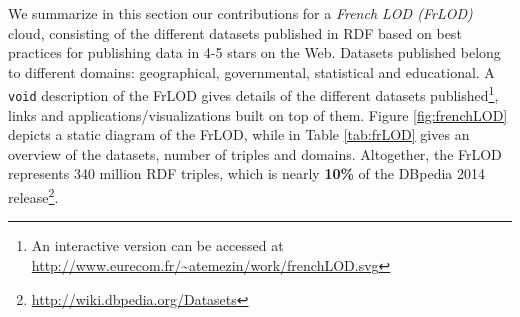We summarize in this section our contributions for a \textit{French LOD (FrLOD)} cloud, consisting of the different datasets published in RDF based on best practices for publishing data in 4-5 stars on the Web. Datasets published belong to different domains: geographical, governmental, statistical and educational. A \texttt{void} description of the FrLOD gives details of the different datasets published\footnote{An interactive version can be accessed at \url{http://www.eurecom.fr/~atemezin/work/frenchLOD.svg}}, links and applications/visualizations built on top of them. Figure  \ref{fig:frenchLOD} depicts a static diagram of the FrLOD, while in Table \ref{tab:frLOD} gives an overview of the datasets, number of triples and domains. Altogether, the FrLOD represents 340 million RDF triples, which is nearly \textbf{10\%} of the DBpedia 2014 release\footnote{\url{http://wiki.dbpedia.org/Datasets}}.  

\begin{figure}[h!tb]
\end{figure}

